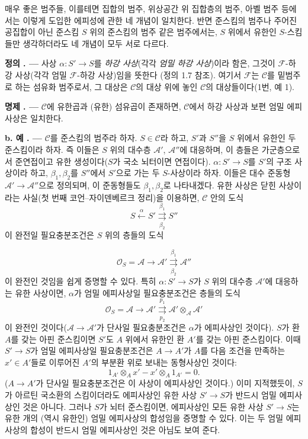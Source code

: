 \documentclass[11pt,twoside,openany]{book}
\numberwithin{equation}{section}
\newcommand{\sourceunit}{front}
\newcommand{\src}[1]{%
  \phantomsection\hypertarget{src:\sourceunit:#1}{}%
  \marginpar{\raggedleft\footnotesize\sffamily #1}%
}
\theoremstyle{plain}
\theoremstyle{definition}
\theoremstyle{remark}
\newcommand{\result}[2]{%
  \par\medskip\noindent\textbf{#1%
  \if\relax\detokenize{#2}\relax\else\space#2\fi. ---}\enspace
}
\begin{document}
매우 좋은 범주들, 이를테면 집합의 범주, 위상공간 위 집합층의 범주,
아벨 범주 등에서는 이렇게 도입한 에피성에 관한 네 개념이 일치한다.
반면 준스킴의 범주나 주어진 공집합이 아닌 준스킴 $S$ 위의 준스킴의
범주 같은 범주에서는, $S$ 위에서 유한인 $S$-스킴들만 생각하더라도
네 개념이 모두 서로 다르다.

\result{정의}{2.4} 사상 $\alpha:S'\longrightarrow S$를
\emph{하강 사상}(각각 \emph{엄밀 하강 사상})이라 함은, 그것이
$\mathcal F$-하강 사상(각각 엄밀 $\mathcal F$-하강 사상)임을 뜻한다
(정의 1.7 참조). 여기서 $\mathcal F$는 $\mathcal C$를 밑범주로 하는
섬유화 범주로서, 그 대상은 $\mathcal C$의 대상 위에 놓인
$\mathcal C$의 대상들이다(1번, 예 1).

\result{명제}{2.1} $\mathcal C$에 유한곱과 (유한) 섬유곱이 존재하면,
$\mathcal C$에서 하강 사상과 보편 엄밀 에피사상은 일치한다.

\result{b. 예}{} $\mathcal C$를 준스킴의 범주라 하자.
$S\in\mathcal C$라 하고, $S'$과 $S''$을 $S$ 위에서 유한인 두
준스킴이라 하자. 즉 이들은 $S$ 위의 대수층 $\mathcal A'$,
$\mathcal A''$에 대응하며, 이 층들은 가군층으로서 준연접이고
유한 생성이다($S$가 국소 뇌터이면 연접이다).
$\alpha:S'\longrightarrow S$를 $S'$의 구조 사상이라 하고,
$\beta_1,\beta_2$를 $S''$에서 $S'$으로 가는 두 $S$-사상이라 하자.
이들은 대수 준동형 $\mathcal A'\longrightarrow\mathcal A''$으로
정의되며, 이 준동형들도 $\beta_1,\beta_2$로 나타내겠다. 유한 사상은
닫힌 사상이라는 사실(첫 번째 코언--자이덴베르크 정리)을 이용하면,
$\mathcal C$ 안의 도식
\[
  \tag{+}
  S\xleftarrow{\alpha}S'
  \overset{\beta_1}{\underset{\beta_2}{\rightrightarrows}}S''
\]
이 완전일 필요충분조건은 $S$ 위의 층들의 도식

\src{306}
\[
  \mathcal O_S=\mathcal A\longrightarrow\mathcal A'
  \overset{\beta_1}{\underset{\beta_2}{\rightrightarrows}}\mathcal A''
\]
이 완전인 것임을 쉽게 증명할 수 있다. 특히
$\alpha:S'\longrightarrow S$가 $S$ 위의 대수층 $\mathcal A'$에
대응하는 유한 사상이면, $\alpha$가 엄밀 에피사상일 필요충분조건은
층들의 도식
\[
  \mathcal O_S=\mathcal A\longrightarrow\mathcal A'
  \overset{p_1}{\underset{p_2}{\rightrightarrows}}
  \mathcal A'\otimes_{\mathcal A}\mathcal A'
\]
이 완전인 것이다($\mathcal A\longrightarrow\mathcal A'$가 단사일
필요충분조건은 $\alpha$가 에피사상인 것이다). $S$가 환 $A$를 갖는
아핀 준스킴이면 $S'$도 $A$ 위에서 유한인 환 $A'$를 갖는 아핀
준스킴이다. 이때 $S'\longrightarrow S$가 엄밀 에피사상일
필요충분조건은 $A\longrightarrow A'$가 $A$를 다음 조건을 만족하는
$x'\in A'$들로 이루어진 $A'$의 부분환 위로 보내는 동형사상인 것이다:
\[
  1_{A'}\otimes_Ax'-x'\otimes_A1_{A'}=0.
\]
($A\longrightarrow A'$가 단사일 필요충분조건은 이 사상이
에피사상인 것이다.) 이미 지적했듯이, $S$가 아르틴 국소환의
스킴이더라도 에피사상인 유한 사상 $S'\longrightarrow S$가 반드시
엄밀 에피사상인 것은 아니다. 그러나 $S$가 뇌터 준스킴이면,
에피사상인 모든 유한 사상 $S'\longrightarrow S$는 유한 개의
(역시 유한인) 엄밀 에피사상의 합성임을 증명할 수 있다. 이는 두
엄밀 에피사상의 합성이 반드시 엄밀 에피사상인 것은 아님도 보여 준다.
\end{document}
